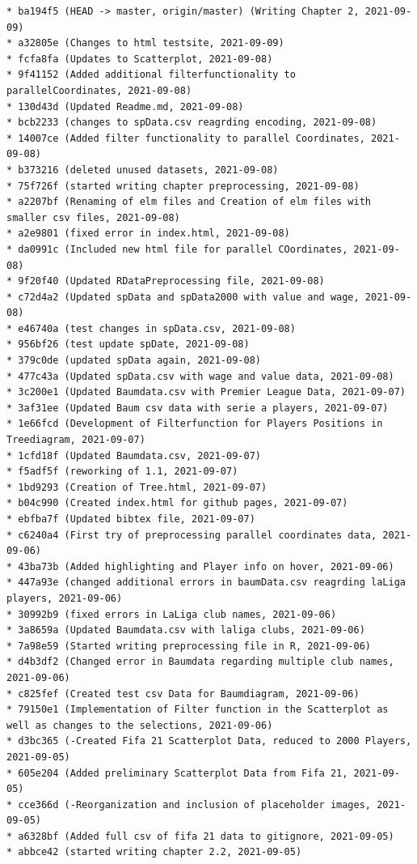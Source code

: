 \documentclass[usegeometry=true]{scrartcl}
\begin{document}
\begin{verbatim}
* ba194f5 (HEAD -> master, origin/master) (Writing Chapter 2, 2021-09-09)
* a32805e (Changes to html testsite, 2021-09-09)
* fcfa8fa (Updates to Scatterplot, 2021-09-08)
* 9f41152 (Added additional filterfunctionality to parallelCoordinates, 2021-09-08)
* 130d43d (Updated Readme.md, 2021-09-08)
* bcb2233 (changes to spData.csv reagrding encoding, 2021-09-08)
* 14007ce (Added filter functionality to parallel Coordinates, 2021-09-08)
* b373216 (deleted unused datasets, 2021-09-08)
* 75f726f (started writing chapter preprocessing, 2021-09-08)
* a2207bf (Renaming of elm files and Creation of elm files with smaller csv files, 2021-09-08)
* a2e9801 (fixed error in index.html, 2021-09-08)
* da0991c (Included new html file for parallel COordinates, 2021-09-08)
* 9f20f40 (Updated RDataPreprocessing file, 2021-09-08)
* c72d4a2 (Updated spData and spData2000 with value and wage, 2021-09-08)
* e46740a (test changes in spData.csv, 2021-09-08)
* 956bf26 (test update spDate, 2021-09-08)
* 379c0de (updated spData again, 2021-09-08)
* 477c43a (Updated spData.csv with wage and value data, 2021-09-08)
* 3c200e1 (Updated Baumdata.csv with Premier League Data, 2021-09-07)
* 3af31ee (Updated Baum csv data with serie a players, 2021-09-07)
* 1e66fcd (Development of Filterfunction for Players Positions in Treediagram, 2021-09-07)
* 1cfd18f (Updated Baumdata.csv, 2021-09-07)
* f5adf5f (reworking of 1.1, 2021-09-07)
* 1bd9293 (Creation of Tree.html, 2021-09-07)
* b04c990 (Created index.html for github pages, 2021-09-07)
* ebfba7f (Updated bibtex file, 2021-09-07)
* c6240a4 (First try of preprocessing parallel coordinates data, 2021-09-06)
* 43ba73b (Added highlighting and Player info on hover, 2021-09-06)
* 447a93e (changed additional errors in baumData.csv reagrding laLiga players, 2021-09-06)
* 30992b9 (fixed errors in LaLiga club names, 2021-09-06)
* 3a8659a (Updated Baumdata.csv with laliga clubs, 2021-09-06)
* 7a98e59 (Started writing preprocessing file in R, 2021-09-06)
* d4b3df2 (Changed error in Baumdata regarding multiple club names, 2021-09-06)
* c825fef (Created test csv Data for Baumdiagram, 2021-09-06)
* 79150e1 (Implementation of Filter function in the Scatterplot as well as changes to the selections, 2021-09-06)
* d3bc365 (-Created Fifa 21 Scatterplot Data, reduced to 2000 Players, 2021-09-05)
* 605e204 (Added preliminary Scatterplot Data from Fifa 21, 2021-09-05)
* cce366d (-Reorganization and inclusion of placeholder images, 2021-09-05)
* a6328bf (Added full csv of fifa 21 data to gitignore, 2021-09-05)
* abbce42 (started writing chapter 2.2, 2021-09-05)

\end{verbatim}
\end{document}
